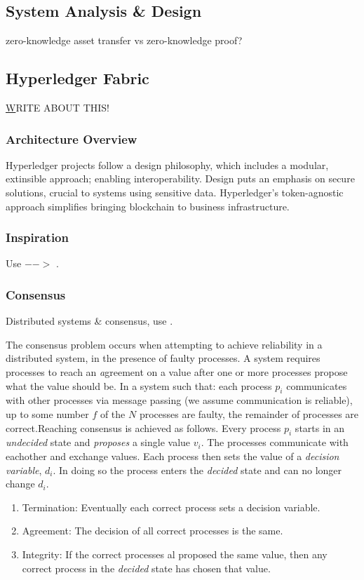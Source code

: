 \documentclass{report}
\begin{document}
\begin{flushleft}
\chapter{System Analysis \& Design}
zero-knowledge asset transfer vs zero-knowledge proof? 

\section{Hyperledger Fabric}
\href{'https://wiki.hyperledger.org/display/fabric/Design+Documents'} WRITE ABOUT THIS!

\subsection{Architecture Overview}
Hyperledger projects follow a design philosophy, which includes a modular, extinsible approach; enabling interoperability.
Design puts an emphasis on secure solutions, crucial to systems using sensitive data.
Hyperledger's token-agnostic approach simplifies bringing blockchain to business infrastructure. %

\subsection{Inspiration} %
Use $-->$ \cite{yuan_design_2018}.

\subsection{Consensus}
Distributed systems \& consensus, use \cite{lamport_byzantine_1982}. \linebreak[1]

The consensus problem occurs when attempting to achieve reliability in a distributed system, in the presence of faulty processes. 
A system requires processes to reach an \emph agreement on a value after one or more processes propose what the value should be. 
In a system such that: each process $p_i$ communicates with other processes via message passing (we assume communication is reliable), up to some number $f$ of the $N$ processes are faulty, the remainder of processes are correct.\linebreak[1]
Reaching consensus is achieved as follows. 
Every process $ p_i $ starts in an \emph{undecided} state and \emph{proposes} a single value $v_i$.
The processes communicate with eachother and exchange values. 
Each process then sets the value of a \emph{decision variable}, $d_i$. 
In doing so the process enters the \emph{decided} state and can no longer change $d_i$.\cite{coulouris_distributed_2011}
\begin{enumerate}
	\item Termination: Eventually each correct process sets a decision variable.
	\item Agreement: The decision of all correct processes is the same.
	\item Integrity: If the correct processes al proposed the same value, then any correct process in the \emph{decided} state has chosen that value.\cite{coulouris_distributed_2011}
\end{enumerate}


\end{flushleft}
\end{document}
